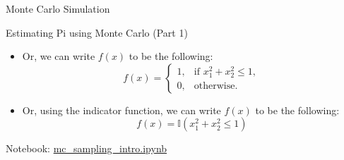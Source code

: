 \documentclass{beamer}
\begin{document}
\begin{section}{Monte Carlo Simulation}
    \begin{frame}[fragile]{Estimating Pi using Monte Carlo (Part 1)}

        \begin{itemize}
        \item Or, we can write $f(x)$ to be the following:
            \[
            f(x) = \begin{cases}
                        1, & \text{if } x_1^2 + x_2^2 \leq 1, \\
                        0, & \text{otherwise}.
                   \end{cases}
            \]
        \item Or, using the indicator function, we can write $f(x)$ to be the following:
            \[
            f(x) = \mathbb{I}(x_1^2 + x_2^2 \leq 1)
            \]
        \end{itemize}
        
        \begin{center}
        \end{center}
    \end{frame}

    \begin{frame}
        Notebook: \url{mc_sampling_intro.ipynb}
    \end{frame}


\end{section}
\end{document}
